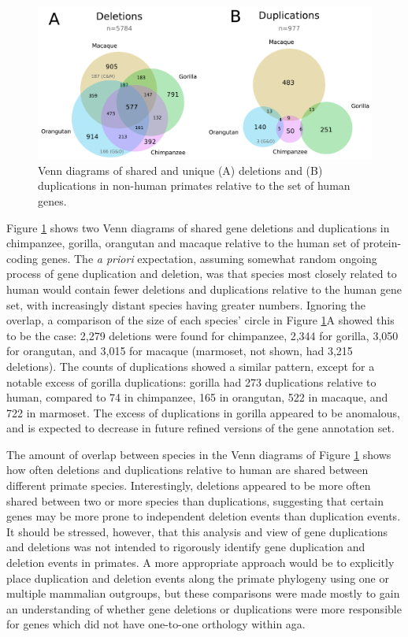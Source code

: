 \begin{figure}
\centering
\includegraphics[scale=0.4]{Figs/gorilla_dup_dels.pdf}
\caption{Venn diagrams of shared and unique (A) deletions and (B)
  duplications in non-human primates relative to the set of human
  genes.}
\label{fig_gorilla_dup_dels}
\end{figure}

Figure \ref{fig_gorilla_dup_dels} shows two Venn diagrams of shared
gene deletions and duplications in chimpanzee, gorilla, orangutan and
macaque relative to the human set of protein-coding genes. The \emph{a
  priori} expectation, assuming somewhat random ongoing process of
gene duplication and deletion, was that species most closely related
to human would contain fewer deletions and duplications relative to
the human gene set, with increasingly distant species having greater
numbers. Ignoring the overlap, a comparison of the size of each
species' circle in Figure \ref{fig_gorilla_dup_dels}A showed this to
be the case: 2,279 deletions were found for chimpanzee, 2,344 for
gorilla, 3,050 for orangutan, and 3,015 for macaque (marmoset, not
shown, had 3,215 deletions). The counts of duplications showed a
similar pattern, except for a notable excess of gorilla duplications:
gorilla had 273 duplications relative to human, compared to 74 in
chimpanzee, 165 in orangutan, 522 in macaque, and 722 in marmoset. The
excess of duplications in gorilla appeared to be anomalous, and is
expected to decrease in future refined versions of the gene annotation
set.

The amount of overlap between species in the Venn diagrams of Figure
\ref{fig_gorilla_dup_dels} shows how often deletions and duplications
relative to human are shared between different primate
species. Interestingly, deletions appeared to be more often shared
between two or more species than duplications, suggesting that certain
genes may be more prone to independent deletion events than
duplication events. It should be stressed, however, that this analysis
and view of gene duplications and deletions was not intended to
rigorously identify gene duplication and deletion events in
primates. A more appropriate approach would be to explicitly place
duplication and deletion events along the primate phylogeny using one
or multiple mammalian outgroups, but these comparisons were made
mostly to gain an understanding of whether gene deletions or
duplications were more responsible for genes which did not have
one-to-one orthology within \ac{aga}.

